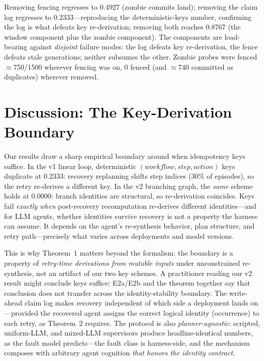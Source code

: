 \documentclass[10pt,journal,compsoc]{IEEEtran}
\begin{document}
Removing fencing regresses to 0.4927 (zombie commits land);
removing the claim log regresses to 0.2333---reproducing the
deterministic-keys number, confirming the log is what defeats
key re-derivation; removing both reaches 0.8767 (the window
component plus the zombie component). The components are
load-bearing against \emph{disjoint} failure modes: the log
defeats key re-derivation, the fence defeats stale generations;
neither subsumes the other. Zombie probes were fenced
$\approx$750/1500 wherever fencing was on, 0 fenced (and
$\approx$740 committed as duplicates) wherever removed.

\section{Discussion: The Key-Derivation Boundary}
\label{sec:discussion}

Our results draw a sharp empirical boundary around when
idempotency keys suffice. In the v1 linear loop, deterministic
$(\mathit{workflow}, \mathit{step}, \mathit{action})$ keys
duplicate at 0.2333: recovery replanning shifts step indices
(30\% of episodes), so the retry re-derives a different key.
In the v2 branching graph, the \emph{same} scheme holds at
0.0000: branch identities are structural, so re-derivation coincides.
Keys fail \emph{exactly when} post-recovery recomputation re-derives
different identities---and for LLM agents, whether identities survive
recovery is not a property the harness can assume. It depends on the
agent's re-synthesis behavior, plan structure, and retry path---precisely
what varies across deployments and model versions.

This is why Theorem~1 matters beyond the formalism: the boundary is a
property of \emph{retry-time derivations from mutable inputs} under
unconstrained re-synthesis, not an artifact of our two key schemes.
A practitioner reading our v2 result might conclude keys suffice;
E2a/E2b and the theorem together say that conclusion does not
transfer across the identity-stability boundary. The write-ahead
claim log makes recovery independent of which side a deployment
lands on---provided the recovered agent assigns the correct logical
identity (occurrence) to each retry, as Theorem~2 requires. The
protocol is also \emph{planner-agnostic}: scripted, uniform-LLM, and
mixed-LLM supervisors produce headline-identical numbers, as the fault
model predicts---the fault class is harness-side, and the mechanism
composes with arbitrary agent cognition \emph{that honors the identity
contract}.
\end{document}
